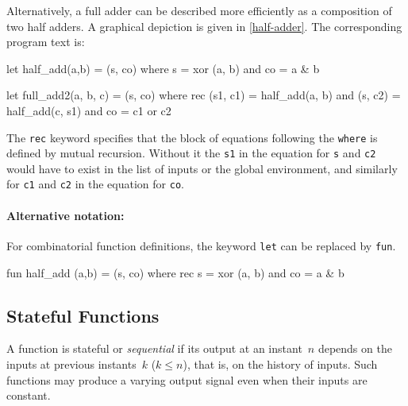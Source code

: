 \documentclass[11pt,titlepage,twoside]{report}
\makeatletter
\newcommand{\zls}[1]{{\@span{class="zelusinline"}#1}}
\newcommand{\zls}[1]{\texttt{#1}}
\renewcommand{\zls}[1]{\texttt{#1}}
\makeatother
\begin{document}
Alternatively, a full adder can be described more efficiently as a 
composition
of two half adders. A graphical depiction is given in
\cref{half-adder}. The corresponding program text is:
\begin{chklisting}
let half_add(a,b) = (s, co) where
       s = xor (a, b)
   and co = a & b
\end{chklisting}
%
\begin{chklisting}
let full_add2(a, b, c) = (s, co) where
  rec (s1, c1) = half_add(a, b)
  and (s, c2) = half_add(c, s1)
  and co = c1 or c2
\end{chklisting}

The \zls{rec} keyword specifies that the block of equations following the 
\zls{where} is defined by mutual recursion.
Without it the \zls{s1} in the equation for \zls{s} and \zls{c2} would have 
to exist in the list of inputs or the global environment, and similarly for 
\zls{c1} and \zls{c2} in the equation for \zls{co}.

\paragraph{Alternative notation:} For combinatorial function definitions, 
the keyword \zls{let} can be replaced by \zls{fun}.
\begin{chklisting}[include=xor]
fun half_add (a,b) = (s, co) where
  rec s = xor (a, b)
  and co = a & b
\end{chklisting}

\subsection{Stateful Functions\label{nodefunc}} %

A function is stateful or \emph{sequential} if its output at an instant~$n$ 
depends on the inputs at previous instants~$k$ ($k \leq n$), that is, on the 
history of inputs.
Such functions may produce a varying output signal even when their inputs 
are constant.
\end{document}
